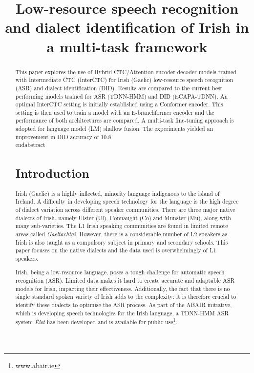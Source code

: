 
\title{Low-resource speech recognition and dialect identification of Irish in a multi-task framework
}
\maketitle










\newpage
\begin{abstract}
This paper explores the use of Hybrid CTC/Attention encoder-decoder models trained with Intermediate CTC (InterCTC) for Irish (Gaelic) low-resource speech recognition (ASR) and dialect identification (DID). Results are compared to the current best performing models trained for ASR (TDNN-HMM) and DID (ECAPA-TDNN). An optimal InterCTC setting is initially established using a Conformer encoder. This setting is then used to train a model with an E-branchformer encoder and the performance of both architectures are compared. A multi-task fine-tuning approach is adopted for language model (LM) shallow fusion. The experiments yielded an improvement in DID accuracy of 10.8\\end{abstract}

\section{Introduction}

Irish (Gaelic) is a highly inflected, minority language indigenous to the island of Ireland. A difficulty in developing speech technology for the language is the high degree of dialect variation across different speaker communities. There are three major native dialects of Irish, namely Ulster (Ul), Connaught (Co) and Munster (Mu), along with many sub-varieties. The L1 Irish speaking communities are found in limited remote areas called \textit{Gaeltachtaí}. However, there is  a considerable number of L2 speakers as Irish is also taught as a compulsory subject in primary and secondary schools. This paper focuses on the native dialects and the data used is overwhelmingly of L1 speakers.

Irish, being a low-resource language, poses a tough challenge for automatic speech recognition (ASR). Limited data makes it hard to create accurate and adaptable ASR models for Irish, impacting their effectiveness.  Additionally, the fact that there is no single standard spoken variety of Irish adds to the complexity: it is therefore crucial to identify these dialects to optimise the ASR process. As part of the ABAIR initiative, which is developing speech technologies for the Irish language, a TDNN-HMM ASR system \textit{Éist} \cite{lonergan2022automatic} has been developed and is available for public use\footnote{www.abair.ie}.  


\end{abstract}
